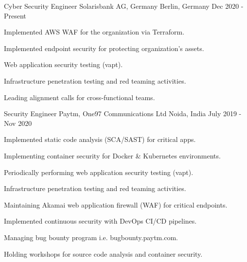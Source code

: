 
\begin{cventries}

\cventry
    {Cyber Security Engineer} %
    {Solarisbank AG, Germany} %
    {Berlin, Germany} %
    {Dec 2020 - Present} %
    {
      \begin{cvitems} %
        \item {Implemented AWS WAF for the organization via Terraform.}
        \item {Implemented endpoint security for protecting organization's assets.}
        \item {Web application security testing (vapt).}
        \item {Infrastructure penetration testing and red teaming activities.}
        \item {Leading alignment calls for cross-functional teams.}
      \end{cvitems}
    }

  \cventry
    {Security Engineer} %
    {Paytm, One97 Communications Ltd} %
    {Noida, India} %
    {July 2019 - Nov 2020} %
    {
      \begin{cvitems} %
        \item {Implemented static code analysis (SCA/SAST) for critical apps.}
        \item {Implementing container security for Docker \& Kubernetes environments.}
        \item {Periodically performing web application security testing (vapt).}
        \item {Infrastructure penetration testing and red teaming activities.}
        \item {Maintaining Akamai web application firewall (WAF) for critical endpoints.}
        \item {Implemented continuous security with DevOps CI/CD pipelines.}
        \item {Managing bug bounty program i.e. bugbounty.paytm.com.}
        \item {Holding workshops for source code analysis and container security.}
      \end{cvitems}
    }


\end{cventries}
